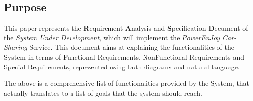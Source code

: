 \subsection{Purpose}
This paper represents the \textbf{R}equirement \textbf{A}nalysis and \textbf{S}pecification \textbf{D}ocument of the \textit{System Under Development}, which will implement the \emph{PowerEnJoy Car-Sharing} Service. This document aims at explaining the functionalities of the System in terms of Functional Requirements, NonFunctional Requirements and Special Requirements, represented using both diagrams and natural language.

The above is a comprehensive list of functionalities provided by the System, that actually translates to a list of goals that the system should reach.


